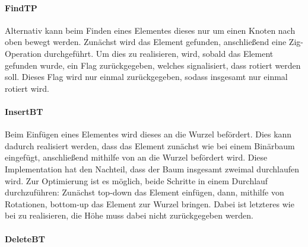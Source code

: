 \paragraph{FindTP}
Alternativ kann beim Finden eines Elementes dieses nur um einen Knoten nach oben bewegt werden.
Zunächst wird das Element gefunden, anschließend eine Zig-Operation durchgeführt.
Um dies zu realisieren, wird, sobald das Element gefunden wurde, ein Flag zurückgegeben, welches
signalisiert, dass rotiert werden soll.
Dieses Flag wird nur einmal zurückgegeben, sodass insgesamt nur einmal rotiert wird.

\paragraph{InsertBT}
Beim Einfügen eines Elementes wird dieses an die Wurzel befördert.
Dies kann dadurch realisiert werden, dass das Element zunächst wie bei einem Binärbaum
eingefügt, anschließend mithilfe von  an die Wurzel befördert wird.
Diese Implementation hat den Nachteil, dass der Baum insgesamt zweimal durchlaufen wird.
Zur Optimierung ist es möglich, beide Schritte in einem Durchlauf durchzuführen: Zunächst top-down
das Element einfügen, dann, mithilfe von Rotationen, bottom-up das Element zur Wurzel bringen.
Dabei ist letzteres wie bei  zu realisieren,
die Höhe muss dabei nicht zurückgegeben werden.

\paragraph{DeleteBT}
